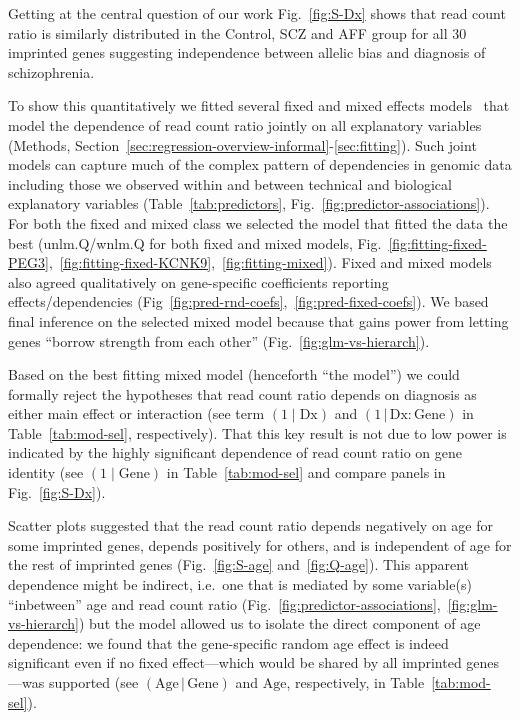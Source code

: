 \documentclass[letterpaper]{article}
\begin{document}
Getting at the central question of our work Fig.~\ref{fig:S-Dx} shows
that read count ratio is similarly distributed in the Control, SCZ and AFF
group for all 30 imprinted genes suggesting independence between allelic bias and diagnosis of
schizophrenia.

To show this quantitatively we fitted several fixed and mixed effects models~\cite{Hoffman2016}
that model the dependence of read count ratio jointly on all explanatory
variables (Methods,
Section~\ref{sec:regression-overview-informal}-\ref{sec:fitting}).  Such joint
models can capture much of the complex pattern of dependencies in genomic data
including those we observed within and between technical and biological
explanatory variables (Table~\ref{tab:predictors},
Fig.~\ref{fig:predictor-associations}).  For both the fixed and mixed class we
selected the model that fitted the data the best (unlm.Q/wnlm.Q for both fixed
and mixed models,
Fig.~\ref{fig:fitting-fixed-PEG3},~\ref{fig:fitting-fixed-KCNK9},~\ref{fig:fitting-mixed}).
Fixed and mixed models also agreed qualitatively on gene-specific coefficients
reporting effects/dependencies
(Fig~\ref{fig:pred-rnd-coefs},~\ref{fig:pred-fixed-coefs}). We based final
inference on the selected mixed model because that gains power from letting
genes ``borrow strength from each other'' (Fig.~\ref{fig:glm-vs-hierarch}).

Based on the best fitting mixed model (henceforth ``the model'') we could formally
reject the hypotheses that read count ratio depends on diagnosis as either
main effect or interaction (see term \((1\mid\mathrm{Dx})\) and
\((1\,|\,\mathrm{Dx}:\mathrm{Gene})\) in Table~\ref{tab:mod-sel},
respectively).  That this key result is not due to low power is indicated by
the highly significant dependence of read count ratio on gene identity
(see \((1\mid\mathrm{Gene})\) in Table~\ref{tab:mod-sel} and compare panels in
Fig.~\ref{fig:S-Dx}).

Scatter plots suggested that the read count ratio depends negatively on age
for some imprinted genes, depends positively for others, and is independent of
age for the rest of imprinted genes (Fig.~\ref{fig:S-age}
and~\ref{fig:Q-age}).  This apparent dependence might be indirect, i.e.~one
that is mediated by some variable(s) ``inbetween'' age and read count ratio
(Fig.~\ref{fig:predictor-associations},~\ref{fig:glm-vs-hierarch}) but the
model allowed us to isolate the direct component of age dependence: we found
that the gene-specific random age effect is indeed significant even if no
fixed effect---which would be shared by all imprinted genes---was supported
(see \((\mathrm{Age}\,|\,\mathrm{Gene})\) and \(\mathrm{Age}\), respectively,
in Table~\ref{tab:mod-sel}).
\end{document}
